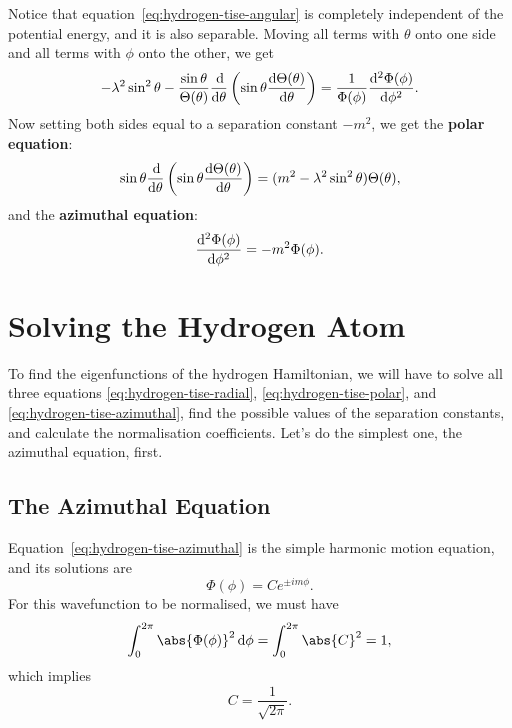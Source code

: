 \documentclass[../quantum_mechanics.tex]{subfiles}
\begin{document}
            Notice that equation~\ref{eq:hydrogen-tise-angular} is completely independent of the potential energy, and it is also separable.
            Moving all terms with $\theta$ onto one side and all terms with $\phi$ onto the other, we get
            \begin{equation}
                -\lambda^2\sin^2\theta-\frac{\sin\theta}{\Theta(\theta)}\dv{}{\theta}\left(\sin\theta\dv{\Theta(\theta)}{\theta}\right)=\frac{1}{\Phi(\phi)}\dv[2]{\Phi(\phi)}{\phi}.
            \end{equation}
            Now setting both sides equal to a separation constant $-m^2$, we get the \textbf{polar equation}:
            \begin{equation}\label{eq:hydrogen-tise-polar}
                \sin\theta\dv{}{\theta}\left(\sin\theta\dv{\Theta(\theta)}{\theta}\right)=(m^2-\lambda^2\sin^2\theta)\Theta(\theta),
            \end{equation}
            and the \textbf{azimuthal equation}:
            \begin{equation}\label{eq:hydrogen-tise-azimuthal}
                \dv[2]{\Phi(\phi)}{\phi}=-m^2\Phi(\phi).
            \end{equation}

    \section{Solving the Hydrogen Atom}\label{sec:solving-the-hydrogen-atom}
        To find the eigenfunctions of the hydrogen Hamiltonian, we will have to solve all three equations \ref{eq:hydrogen-tise-radial}, \ref{eq:hydrogen-tise-polar}, and \ref{eq:hydrogen-tise-azimuthal}, find the possible values of the separation constants, and calculate the normalisation coefficients.
        Let's do the simplest one, the azimuthal equation, first.

        \subsection{The Azimuthal Equation}\label{sec:solving-the-hydrogen-atom:subsec:the-azimuthal-equation}
            Equation~\ref{eq:hydrogen-tise-azimuthal} is the simple harmonic motion equation, and its solutions are
            \begin{equation}
                \Phi(\phi)=Ce^{\pm im\phi}.
            \end{equation}
            For this wavefunction to be normalised, we must have
            \begin{equation}
                \int_0^{2\pi}\abs{\Phi(\phi)}^2\dd{\phi}=\int_0^{2\pi}\abs{C}^2=1,
            \end{equation}
            which implies
            \begin{equation}
                C=\frac{1}{\sqrt{2\pi}}.
            \end{equation}
            
\end{document}
